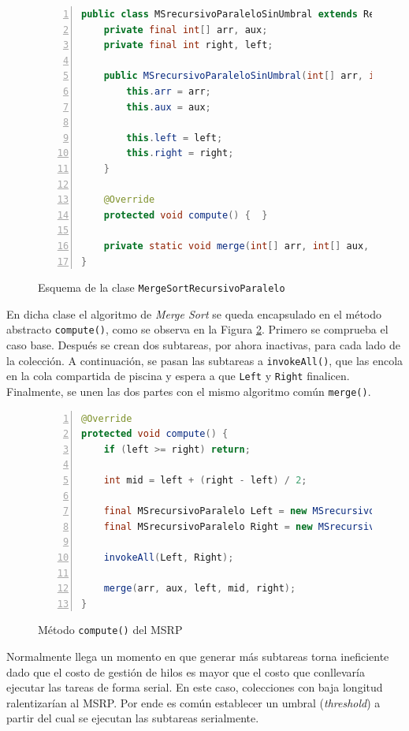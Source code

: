 \documentclass[titlepage]{article}
\begin{document}
\begin{figure}[h]
	\begin{lstlisting}[language=java, frame=single, numbers=left]
public class MSrecursivoParaleloSinUmbral extends RecursiveAction {
	private final int[] arr, aux;
	private final int right, left;
	
	public MSrecursivoParaleloSinUmbral(int[] arr, int[] aux, int left, int right) {
		this.arr = arr;
		this.aux = aux;
		
		this.left = left;
		this.right = right;
	}
	
	@Override
	protected void compute() {	}
	
	private static void merge(int[] arr, int[] aux, int left, int mid, int right) {	}	
}    	
	\end{lstlisting}
	\caption{Esquema de la clase \lstinline{MergeSortRecursivoParalelo}}
	\label{fig:MSRP_RecursiveAction}
\end{figure}

En dicha clase el algoritmo de \textit{Merge Sort} se queda encapsulado en el método abstracto \lstinline{compute()}, como se observa en la Figura \ref{fig:MSRP_Compute}. Primero se comprueba el caso base. Después se crean dos subtareas, por ahora inactivas, para cada lado de la colección. A continuación, se pasan las subtareas a \lstinline{invokeAll()}, que las encola en la cola compartida de piscina y espera a que \lstinline{Left} y \lstinline{Right} finalicen. Finalmente, se unen las dos partes con el mismo algoritmo común \lstinline{merge()}.

\begin{figure}[h]
    \begin{lstlisting}[language=java, frame=single, numbers=left]
@Override
protected void compute() {
	if (left >= right) return;
	
	int mid = left + (right - left) / 2;
	
	final MSrecursivoParalelo Left = new MSrecursivoParalelo(arr, aux, left, mid);
	final MSrecursivoParalelo Right = new MSrecursivoParalelo(arr, aux, mid + 1, right);
	
	invokeAll(Left, Right);
	
	merge(arr, aux, left, mid, right);
}
    \end{lstlisting}
    \caption{Método \lstinline{compute()} del MSRP}
    \label{fig:MSRP_Compute}
\end{figure}

Normalmente llega un momento en que generar más subtareas torna ineficiente dado que el costo de gestión de hilos es mayor que el costo que conllevaría ejecutar las tareas de forma serial. En este caso, colecciones con baja longitud ralentizarían al MSRP. Por ende es común establecer un umbral (\textit{threshold}) a partir del cual se ejecutan las subtareas serialmente.
\end{document}
